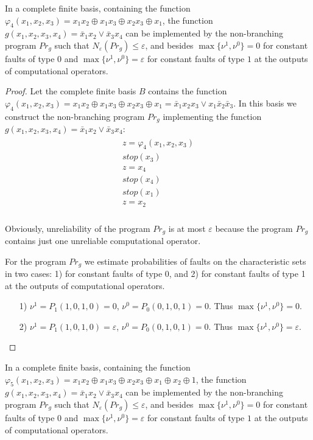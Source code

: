 \documentclass[
11pt,%
tightenlines,%
twoside,%
onecolumn,%
nofloats,%
nobibnotes,%
nofootinbib,%
superscriptaddress,%
noshowpacs,%
centertags]%
{revtex4}
\begin{document}
\begin{lemma}\label{l5}
In a complete finite basis, containing the function $\varphi_4(x_1,
x_2, x_3)=x_1 x_2\oplus x_1 x_3 \oplus x_2 x_3 \oplus x_1$, the
function $g(x_1, x_2, x_3, x_4)= \bar{x}_1x_2 \vee \bar{x}_3 x_4$
can  be implemented by the non-branching program $Pr_g$ such that
$N_\varepsilon(Pr_g)\leq \varepsilon$, and besides $\max\{\nu^1,
\nu^0\}=0$ for constant faults of type $0$ and $\max\{\nu^1,
\nu^0\}=\varepsilon$ for constant faults of type $1$ at the outputs
of computational operators.
\end{lemma}

\begin{proof}
Let the complete finite basis $B$ contains the function $\varphi_4(x_1, x_2, x_3)=x_1 x_2\oplus x_1 x_3 \oplus x_2 x_3 \oplus x_1=\bar{x}_1x_2x_3\vee x_1\bar{x}_2\bar{x}_3$. In this basis we construct the non-branching program $Pr_g$ implementing the function $g(x_1, x_2, x_3, x_4)= \bar{x}_1 x_2 \vee \bar{x}_3 x_4$:
\begin{eqnarray*}
\begin{array}{l}
  z=\varphi_4(x_1, x_2, x_3)\\
  stop(x_3)\\
  z=x_4\\
  stop(x_4)\\
  stop(x_1)\\
  z=x_2\\
\end{array}
\end{eqnarray*}

Obviously, unreliability of the program $Pr_g$ is at most
$\varepsilon$ because the program $Pr_g$ contains just one
unreliable computational operator.

For the program $Pr_g$ we estimate probabilities of faults on  the
characteristic sets in two cases: 1) for constant faults of type 0,
and 2) for constant faults of type 1 at the outputs of computational
operators.
\begin{itemize}
\item[1)] $\nu^1=P_1(1, 0, 1, 0)=0$,  $\nu^0=P_0(0, 1, 0, 1)=0$. Thus $\max\{\nu^1, \nu^0\}=0$.
\item[2)] $\nu^1=P_1(1, 0, 1, 0)=\varepsilon$,  $\nu^0=P_0(0, 1, 0, 1)=0$. Thus $\max\{\nu^1, \nu^0\}=\varepsilon$.
\end{itemize}

\end{proof}

\begin{lemma}\label{l6}
In a complete finite basis, containing the function $\varphi_5(x_1,
x_2, x_3)=x_1 x_2\oplus x_1 x_3 \oplus x_2 x_3 \oplus x_1\oplus x_2
\oplus 1$, the function $g(x_1, x_2, x_3, x_4)= \bar{x}_1x_2 \vee
\bar{x}_3 x_4$ can be implemented by the non-branching program
$Pr_g$ such that $N_\varepsilon(Pr_g)\leq \varepsilon$, and besides
$\max\{\nu^1, \nu^0\}=0$ for constant faults of type $0$ and
$\max\{\nu^1, \nu^0\}=\varepsilon$ for constant faults of type $1$
at the outputs of computational operators.
\end{lemma}
\end{document}
